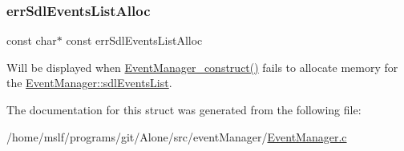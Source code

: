 \subsubsection{\texorpdfstring{err\+Sdl\+Events\+List\+Alloc}{errSdlEventsListAlloc}}
{\footnotesize\ttfamily const char$\ast$ const err\+Sdl\+Events\+List\+Alloc}

Will be displayed when \hyperlink{_event_manager_8h_ab29e0486e59b74a74b8bd7832bbe573b}{Event\+Manager\+\_\+construct()} fails to allocate memory for the \hyperlink{struct_event_manager_ac563054d2cefbd8d20b1daf70eb35d78}{Event\+Manager\+::sdl\+Events\+List}. 

The documentation for this struct was generated from the following file\+:\begin{DoxyCompactItemize}
\item 
/home/mslf/programs/git/\+Alone/src/event\+Manager/\hyperlink{_event_manager_8c}{Event\+Manager.\+c}\end{DoxyCompactItemize}
